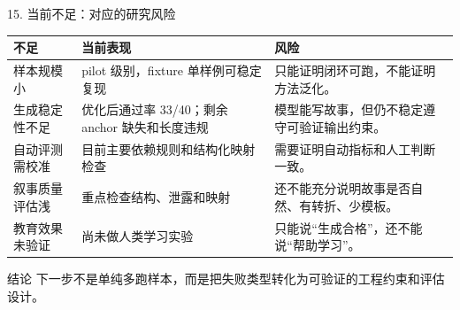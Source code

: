 \documentclass[aspectratio=169,UTF8]{ctexbeamer}
\begin{document}
\begin{frame}{15. 当前不足：对应的研究风险}
  \small
  \begin{tabularx}{\textwidth}{p{} X X}
    \toprule
    不足 & 当前表现 & 风险 \\
    \midrule
    样本规模小 & pilot 级别，fixture 单样例可稳定复现 & 只能证明闭环可跑，不能证明方法泛化。 \\
    生成稳定性不足 & 优化后通过率 33/40；剩余 anchor 缺失和长度违规 & 模型能写故事，但仍不稳定遵守可验证输出约束。 \\
    自动评测需校准 & 目前主要依赖规则和结构化映射检查 & 需要证明自动指标和人工判断一致。 \\
    叙事质量评估浅 & 重点检查结构、泄露和映射 & 还不能充分说明故事是否自然、有转折、少模板。 \\
    教育效果未验证 & 尚未做人类学习实验 & 只能说“生成合格”，还不能说“帮助学习”。 \\
    \bottomrule
  \end{tabularx}

  \vspace{0.6em}
  \begin{block}{结论}
    下一步不是单纯多跑样本，而是把失败类型转化为可验证的工程约束和评估设计。
  \end{block}
\end{frame}
\end{document}
